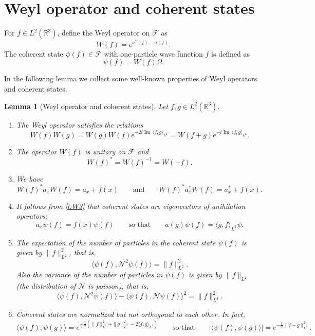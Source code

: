 \documentclass[11pt,a4paper]{scrartcl}
\newtheorem{lem}[thm]{Lemma}
\newcommand{\R}{\mathds{R}}
\newcommand{\N}{\mathcal{N}}
\renewcommand{\Im}{\operatorname{Im}\,} 	%
\begin{document}
\section{Weyl operator and coherent states}


For $f \in L^2(\R^3)$, define the Weyl operator on $\mathcal{F}$ as
\[
  W(f) = e^{a^*(f) - a(f)}.
\]
The coherent state $\psi(f) \in \mathcal{F}$ with one-particle wave function
$f$ is defined as
\[
  \psi(f) = W(f) \Omega.
\]


In the following lemma we collect some well-known properties of Weyl operators
and coherent states.


\begin{lem}[Weyl operator and coherent states] \label{l:W}
  Let $f, g \in L^2(\R^3)$.
  \begin{enumerate}
    \item \label{l:W1} The Weyl operator satisfies the relations
      \[
        W(f) W(g) = W(g) W(f) e^{-2i \Im \langle f, g \rangle_{L^2}} = W(f+g)
        e^{-i \Im \langle f, g \rangle_{L^2}}.
      \]
    \item \label{l:W2} The operator $W(f)$ is unitary on $\mathcal{F}$ and
      \[
        W(f)^* = W(f)^{-1} = W(-f).
      \]
    \item \label{l:W3} We have
      \[
        W(f)^* a_x W(f) = a_x + f(x) \qquad \text{and} \qquad W(f)^* a_x^*
        W(f) = a_x^* + \overline{f(x)}.
      \]
    \item \label{l:W4} It follows from \ref{l:W3} that coherent states are
      eigenvectors of anihilation operators:
      \[
        a_x \psi(f) = f(x) \psi(f) \qquad \text{so that} \qquad a(g) \psi(f)
        = \langle g, f \rangle_{L^2} \psi.
      \]
    \item \label{l:W5} The expectation of the number of particles in the
      coherent state $\psi(f)$ is given by $\| f \|_{L^2}^2$, that is,
      \[
        \langle \psi(f), \N^2 \psi(f) \rangle = \| f \|_{L^2}^2.
      \]
      Also the variance of the number of particles in $\psi(f)$ is given by
      $\| f \|_{L^2}$ (the distribution of $\N$ is poisson), that is,
      \[
        \langle \psi(f), \N^2 \psi(f) \rangle - \langle \psi(f), \N \psi(f)
        \rangle^2 = \| f \|_{L^2}^2.
      \]
    \item \label{l:W6} Coherent states are normalized but not orthogonal to
      each other. In fact,
      \[
        \langle \psi(f), \psi(g) \rangle = e^{-\frac{1}{2} (\| f \|_{L^2}^2 +
        \| g \|_{L^2}^2 - 2 \langle f, g \rangle_{L^2} )} \qquad \text{so
        that} \qquad |\langle \psi(f), \psi(g) \rangle| = e^{-\frac{1}{2} \| f
        - g \|_{L^2}^2}.
      \]
  \end{enumerate}
\end{lem}
\end{document}
